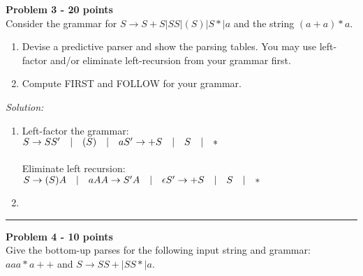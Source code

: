 \documentclass[a4paper, 11pt]{article}
\newenvironment{problem}[2][Problem]
    { \begin{mdframed}[backgroundcolor=gray!20] \textbf{#1 #2} \\}
    {  \end{mdframed}}
\newenvironment{solution}
    {\textit{Solution:}}
    {}
\begin{document}

\begin{problem}{3 - 20 points}
Consider the grammar for $S  \longrightarrow S + S | SS | (S) | S * | a $ and the string $(a + a)* a$.

\begin{enumerate}[a]
    \item Devise a predictive parser and show the parsing tables. You may use left-factor and/or eliminate left-recursion from your grammar first.
    \item Compute FIRST and FOLLOW for your grammar.
\end{enumerate}

\end{problem}

\begin{solution}
    \begin{enumerate}[a]
        \item Left-factor the grammar:\\
        $S \rightarrow S S' \quad | \quad (S) \quad | \quad a\\
        S' \rightarrow +S \quad | \quad S \quad | \quad *$\\ \\
        Eliminate left recursion:\\
        $S \rightarrow (S) A \quad | \quad a A \\
        A \rightarrow S'A \quad | \quad \epsilon \\
        S' \rightarrow +S \quad | \quad S \quad | \quad *$
        \item
    \end{enumerate}
\end{solution}

\noindent\rule{7in}{2.8pt}

\begin{problem}{4 - 10 points}
Give the bottom-up parses for the following input string and grammar: $aaa*a++$ and $S  \longrightarrow SS+ | SS* | a $.

\end{problem}
\end{document}
